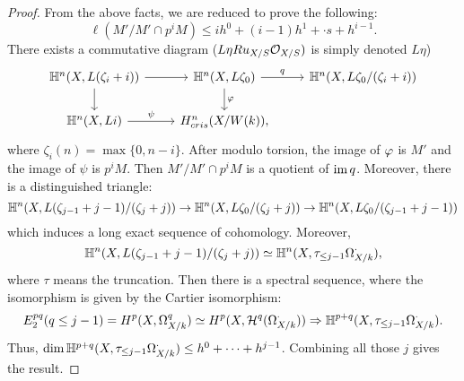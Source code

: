 \begin{proof}
    From the above facts, we are reduced to prove the following:
    \[
        \ell(M'/M' \cap p^i M) \leq i h^0 + (i - 1) h^1 + \cdot s+ h^{i - 1}. 
    \]
    There exists a commutative diagram ($L\eta Ru_{X/S}{\mathcal {O}}_{X/S})$ is simply denoted $L\eta$)
    \[
        \begin{tikzcd}
            \BH^n(X, L(\zeta_i + i)) \ar[r] \ar[d] & 
            \BH^n(X, L\zeta_0) \ar[r, "q"] \ar[d,"\vp"] & 
            \BH^n(X, L\zeta_0/(\zeta_i + i)) \\
            \BH^n(X, Li) \ar[r, "\psi"] & \Hkn,
        \end{tikzcd}
    \]
    where $\zeta_i(n) = \max \{0, n - i\}$.
    After modulo torsion, the image of $\varphi$ is $M'$ and the image of $\psi$ is $p^i M$. 
    Then $M'/M' \cap p^i M$ is a quotient of $\operatorname{im} q$. 
    Moreover, there is a distinguished triangle:
    \[
        {\mathbb {H}}^n(X, L(\zeta_{j - 1} + j - 1)/(\zeta_j + j)) \to 
        {\mathbb {H}}^n(X, L\zeta_0/(\zeta_j + j)) \to 
        {\mathbb {H}}^n(X, L\zeta_0/(\zeta_{j-1} + j - 1))
    \]
    which induces a long exact sequence of cohomology. Moreover, 
    \[
        {\mathbb {H}}^n(X, L(\zeta_{j - 1} + j - 1)/(\zeta_j + j)) 
        \simeq {\mathbb {H}}^n(X, \tau_{\leq j - 1} \Omega_{X/k}^\cdot),
    \]
    where $\tau$ means the truncation.
    Then there is a spectral sequence, 
    where the isomorphism is given by the Cartier isomorphism:
    \[
        E_2^{pq}(q \leq j - 1) = H^p(X, \Omega_{X/k}^q) 
        \simeq H^p(X, {\mathcal {H}}^q(\Omega_{X/k}^\cdot)) 
        \Rightarrow {\mathbb {H}}^{p+q}(X, \tau_{\leq j - 1} \Omega_{X/k}^\cdot).
    \]
    Thus, $\dim {\mathbb {H}}^{p+q}(X, \tau_{\leq j - 1} \Omega_{X/k}^\cdot) \leq h^0 + \cdots + h^{j - 1}$. 
    Combining all those $j$ gives the result.
\end{proof}